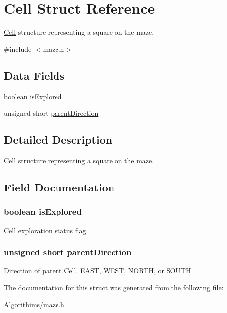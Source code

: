 \hypertarget{struct_cell}{}\section{Cell Struct Reference}
\label{struct_cell}


\hyperlink{struct_cell}{Cell} structure representing a square on the maze.  




{\ttfamily \#include $<$maze.\+h$>$}

\subsection*{Data Fields}
\begin{DoxyCompactItemize}
\item 
boolean \hyperlink{struct_cell_a75ba34cac637d0a4dec9e6fd2a4dbf73}{is\+Explored}
\item 
unsigned short \hyperlink{struct_cell_acc56b23d659b0632734d8b2061eea38c}{parent\+Direction}
\end{DoxyCompactItemize}


\subsection{Detailed Description}
\hyperlink{struct_cell}{Cell} structure representing a square on the maze. 

\subsection{Field Documentation}
\hypertarget{struct_cell_a75ba34cac637d0a4dec9e6fd2a4dbf73}{}
\subsubsection[{is\+Explored}]{\setlength{\rightskip}{0pt plus 5cm}boolean is\+Explored}\label{struct_cell_a75ba34cac637d0a4dec9e6fd2a4dbf73}
\hyperlink{struct_cell}{Cell} exploration status flag. \hypertarget{struct_cell_acc56b23d659b0632734d8b2061eea38c}{}
\subsubsection[{parent\+Direction}]{\setlength{\rightskip}{0pt plus 5cm}unsigned short parent\+Direction}\label{struct_cell_acc56b23d659b0632734d8b2061eea38c}
Direction of parent \hyperlink{struct_cell}{Cell}. E\+A\+S\+T, W\+E\+S\+T, N\+O\+R\+T\+H, or S\+O\+U\+T\+H 

The documentation for this struct was generated from the following file\+:\begin{DoxyCompactItemize}
\item 
Algorithims/\hyperlink{maze_8h}{maze.\+h}\end{DoxyCompactItemize}
